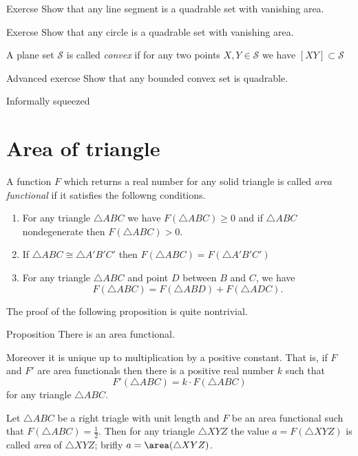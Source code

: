 \begin{thm}{Exercse}
Show that any line segment is a quadrable set with vanishing area.
\end{thm}

\begin{thm}{Exercse}
Show that any circle is a quadrable set with vanishing area.
\end{thm}

A plane set $\mathcal{S}$
is called \emph{convex} if for any two points $X,Y\in \mathcal{S}$
we have $[XY]\subset \mathcal{S}$

\begin{thm}{Advanced exercse}
Show that any bounded convex set is quadrable.
\end{thm}



Informally squeezed


\section*{Area of triangle}


A function $F$ which returns a real number 
for any solid triangle is called \emph{area functional} if it satisfies the followng conditions.

\begin{enumerate}
\item For any triangle $\triangle ABC$ we have $F(\triangle ABC)\ge 0$ and 
if  $\triangle ABC$ nondegenerate then $F(\triangle ABC)>0$.
\item If $\triangle ABC\cong\triangle A'B'C'$ 
 then $F(\triangle ABC)=F(\triangle A'B'C')$
\item For any triangle $ \triangle ABC$ and point $D$ between $B$ and $C$, we have
$$F(\triangle ABC)=F(\triangle ABD)+F(\triangle ADC).$$
\end{enumerate}

The proof of the following proposition is quite nontrivial.

\begin{thm}{Proposition}
There is an area functional. 

Moreover it is unique up to multiplication by a positive constant. 
That is, if $F$ and $F'$ are area functionals then there is a positive real number $k$ such that 
\[F'(\triangle ABC)=k\cdot F(\triangle ABC)\]
for any triangle $\triangle ABC$.
\end{thm}

Let $\triangle ABC$ be a right triagle with unit length
and $F$ be an area functional such that $F(\triangle ABC)=\tfrac12$.
Then for any triangle $\triangle XYZ$ the value $a=F(\triangle XYZ)$ is called \emph{area} of $\triangle XYZ$;
brifly $a=\area(\triangle XYZ)$.















